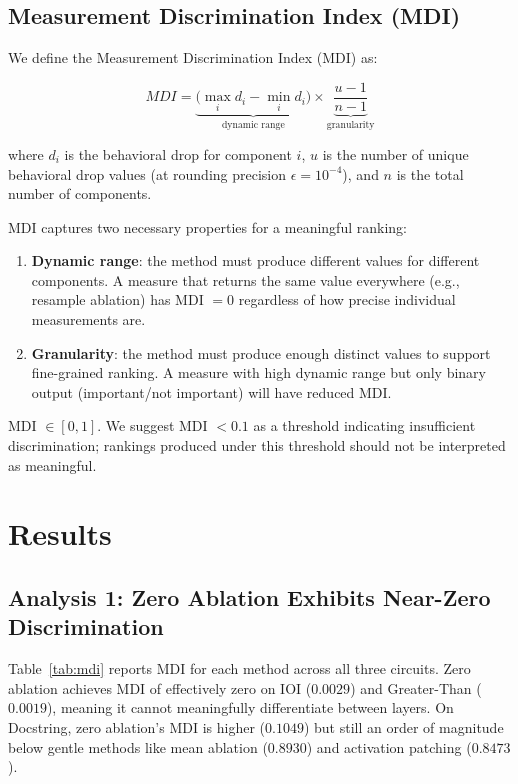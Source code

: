 \documentclass[pdflatex,sn-mathphys-num]{sn-jnl}
\newcommand{\mdi}{\textit{MDI}}
\begin{document}
\subsection{Measurement Discrimination Index (MDI)}

We define the Measurement Discrimination Index (MDI) as:

\[
\mdi = \underbrace{\Big(\max_{i} d_i - \min_{i} d_i\Big)}_{\text{dynamic range}} \times
\underbrace{\frac{u - 1}{n - 1}}_{\text{granularity}}
\]

where $d_i$ is the behavioral drop for component $i$, $u$ is the number of unique behavioral drop values (at rounding precision $\epsilon = 10^{-4}$), and $n$ is the total number of components.

MDI captures two necessary properties for a meaningful ranking:
\begin{enumerate}
    \item \textbf{Dynamic range}: the method must produce different values for different components. A measure that returns the same value everywhere (e.g., resample ablation) has MDI $= 0$ regardless of how precise individual measurements are.
    \item \textbf{Granularity}: the method must produce enough distinct values to support fine-grained ranking. A measure with high dynamic range but only binary output (important/not important) will have reduced MDI.
\end{enumerate}

MDI $\in [0, 1]$. We suggest MDI $< 0.1$ as a threshold indicating insufficient discrimination; rankings produced under this threshold should not be interpreted as meaningful.

\section{Results}

\subsection{Analysis 1: Zero Ablation Exhibits Near-Zero Discrimination}

Table~\ref{tab:mdi} reports MDI for each method across all three circuits. Zero ablation achieves MDI of effectively zero on IOI ($0.0029$) and Greater-Than ($0.0019$), meaning it cannot meaningfully differentiate between layers. On Docstring, zero ablation's MDI is higher ($0.1049$) but still an order of magnitude below gentle methods like mean ablation ($0.8930$) and activation patching ($0.8473$).
\end{document}
